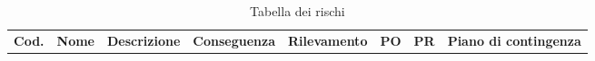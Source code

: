 
\begin{landscape}
	\begin{longtable}{p{0.6cm}|p{2.2cm}|p{3.2cm}|p{2cm}|p{4cm}|p{0.9cm}|p{0.8cm}|p{4cm}}
		\arrayrulecolor{white}
		\caption{Tabella dei rischi}\\ 
		\hline
		\rowcolor{header}
		\textbf{Cod.} & \textbf{Nome} & \textbf{Descrizione} & \textbf{Conseguenza}  & \textbf{Rilevamento} & \textbf{PO} & \textbf{PR} & \textbf{Piano di contingenza} \\
		\hline
		

\end{longtable}
\end{landscape}
